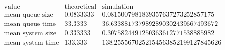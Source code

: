 \[\begin{array}{cccc}
 \text{value} & \text{theoretical} & \text{simulation} & \text{} \\
 \text{mean queue size} & 0.0833333 & 0.0815007981839357637273252857175 & \text{} \\
 \text{mean queue time} & 33.3333 & 36.6338817379892890302439667493672 & \text{} \\
 \text{mean system size} & 0.333333 & 0.3075824491250363612771538885982 & \text{} \\
 \text{mean system time} & 133.333 & 138.2555670252154563852199127845626 & \text{} \\
\end{array}\]


